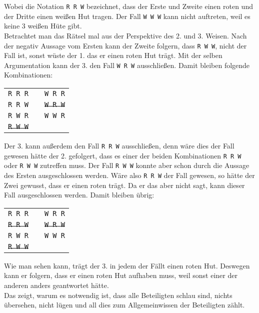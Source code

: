 %
Wobei die Notation \texttt{R R W} bezeichnet, dass der Erste und Zweite einen roten und der Dritte einen weißen Hut tragen.
Der Fall \texttt{W W W} kann nicht auftreten, weil es keine 3 weißen Hüte gibt.\\
Betrachtet man das Rätsel mal aus der Perspektive des 2. und 3. Weisen. 
Nach der negativ Aussage vom Ersten kann der Zweite folgern, dass \texttt{R W W}, nicht der Fall ist, sonst wüste der 1. das er einen roten Hut trägt. 
Mit der selben Argumentation kann der 3. den Fall \texttt{W R W} ausschließen. 
Damit bleiben folgende Kombinationen:\\
\begin{tabular}{ccc}
\texttt{R R R} &   & \texttt{W R R}\\
\texttt{R R W} &   & \sout{\texttt{W R W}}\\
\texttt{R W R} &   & \texttt{W W R}\\
\sout{\texttt{R W W}} &   &   \\
\end{tabular}
%
Der 3. kann außerdem den Fall \texttt{R R W} ausschließen, denn wäre dies der Fall gewesen hätte der 2. gefolgert, dass es einer der beiden Kombinationen \texttt{R R W} oder \texttt{R W W} zutreffen muss.
Der Fall \texttt{R W W} konnte aber schon durch die Aussage des Ersten ausgeschlossen werden.
Wäre also \texttt{R R W} der Fall gewesen, so hätte der Zwei gewusst, dass er einen roten trägt. Da er das aber nicht sagt, kann dieser Fall ausgeschlossen werden.
Damit bleiben übrig:\\
%
\begin{tabular}{ccc}
\texttt{R R R} &   & \texttt{W R R}\\
\sout{\texttt{R R W}} &   & \sout{\texttt{W R W}}\\
\texttt{R W R} &   & \texttt{W W R}\\
\sout{\texttt{R W W}} &   &   \\
\end{tabular}
Wie man sehen kann, trägt der 3. in jedem der Fällt einen roten Hut.
Deswegen kann er folgern, dass er einen roten Hut aufhaben muss, weil sonst einer der anderen anders geantwortet hätte.\\
Das zeigt, warum es notwendig ist, dass alle Beteiligten schlau sind, nichts übersehen, nicht lügen und all dies zum Allgemeinwissen der Beteiligten zählt.




